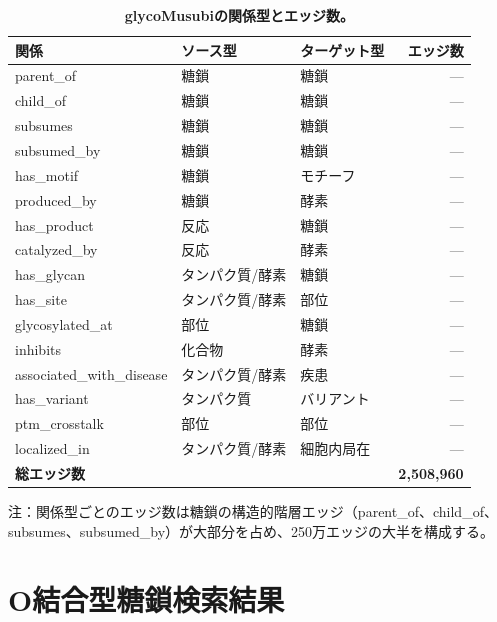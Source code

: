 \documentclass[11pt,a4paper]{ltjsarticle}
\begin{document}
\begin{table}[H]
\centering
\caption{\textbf{glycoMusubiの関係型とエッジ数。}}
\label{tab:relation_types}
\small
\begin{tabular}{lllr}
\toprule
\textbf{関係} & \textbf{ソース型} & \textbf{ターゲット型} & \textbf{エッジ数} \\
\midrule
parent\_of         & 糖鎖   & 糖鎖   & --- \\
child\_of          & 糖鎖   & 糖鎖   & --- \\
subsumes           & 糖鎖   & 糖鎖   & --- \\
subsumed\_by       & 糖鎖   & 糖鎖   & --- \\
has\_motif         & 糖鎖   & モチーフ    & --- \\
produced\_by       & 糖鎖   & 酵素   & --- \\
has\_product       & 反応 & 糖鎖   & --- \\
catalyzed\_by      & 反応 & 酵素   & --- \\
has\_glycan        & タンパク質/酵素 & 糖鎖 & --- \\
has\_site          & タンパク質/酵素 & 部位   & --- \\
glycosylated\_at   & 部位     & 糖鎖   & --- \\
inhibits           & 化合物 & 酵素   & --- \\
associated\_with\_disease & タンパク質/酵素 & 疾患 & --- \\
has\_variant       & タンパク質  & バリアント  & --- \\
ptm\_crosstalk     & 部位     & 部位     & --- \\
localized\_in      & タンパク質/酵素 & 細胞内局在 & --- \\
\midrule
\multicolumn{3}{l}{\textbf{総エッジ数}} & \textbf{2,508,960} \\
\bottomrule
\end{tabular}
\end{table}

注：関係型ごとのエッジ数は糖鎖の構造的階層エッジ（parent\_of、child\_of、subsumes、subsumed\_by）が大部分を占め、250万エッジの大半を構成する。

\section{O結合型糖鎖検索結果}
\label{sec:olinked}
\end{document}
